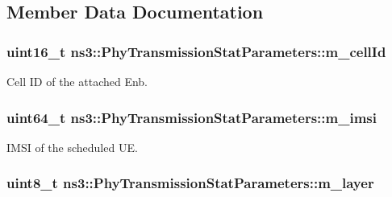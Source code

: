 \subsection{Member Data Documentation}
\subsubsection[{\texorpdfstring{m\+\_\+cell\+Id}{m_cellId}}]{\setlength{\rightskip}{0pt plus 5cm}uint16\+\_\+t ns3\+::\+Phy\+Transmission\+Stat\+Parameters\+::m\+\_\+cell\+Id}\hypertarget{structns3_1_1PhyTransmissionStatParameters_aa22689086849b94c2f5c35545807d94e}{}\label{structns3_1_1PhyTransmissionStatParameters_aa22689086849b94c2f5c35545807d94e}


Cell ID of the attached Enb. 

\subsubsection[{\texorpdfstring{m\+\_\+imsi}{m_imsi}}]{\setlength{\rightskip}{0pt plus 5cm}uint64\+\_\+t ns3\+::\+Phy\+Transmission\+Stat\+Parameters\+::m\+\_\+imsi}\hypertarget{structns3_1_1PhyTransmissionStatParameters_a61afee12f7bec87f431f09c298e4981e}{}\label{structns3_1_1PhyTransmissionStatParameters_a61afee12f7bec87f431f09c298e4981e}


I\+M\+SI of the scheduled UE. 

\subsubsection[{\texorpdfstring{m\+\_\+layer}{m_layer}}]{\setlength{\rightskip}{0pt plus 5cm}uint8\+\_\+t ns3\+::\+Phy\+Transmission\+Stat\+Parameters\+::m\+\_\+layer}\hypertarget{structns3_1_1PhyTransmissionStatParameters_a3a44ee0d8c9791d51f3b5dcae82806ca}{}\label{structns3_1_1PhyTransmissionStatParameters_a3a44ee0d8c9791d51f3b5dcae82806ca}


